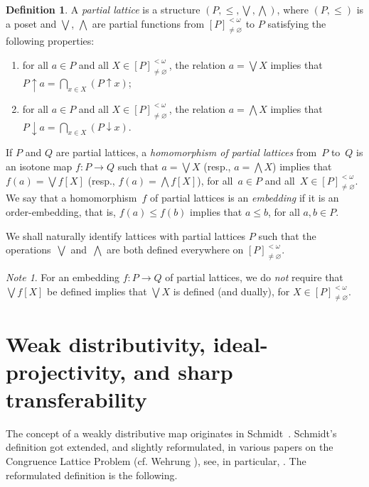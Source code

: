 \documentclass[reqno]{amsart}
\numberwithin{equation}{section}
\theoremstyle{plain}
\theoremstyle{definition}
\newtheorem{definition}[theorem]{Definition}
\theoremstyle{remark}
\newtheorem*{note}{Note}
\numberwithin{figure}{section}
\numberwithin{table}{section}
\begin{document}
\begin{definition}\label{D:PartLatt}
A \emph{partial lattice} is a structure $(P,\leq,\bigvee,\bigwedge)$, where
$(P,\leq)$ is a poset and $\bigvee$, $\bigwedge$ are partial functions from
${[P]_{\neq{\varnothing}}^{<\omega}}$ to $P$ satisfying the following properties:
\begin{enumerate}
\item for all $a\in P$ and all $X\in{[P]_{\neq{\varnothing}}^{<\omega}}$\,, the relation $a=\bigvee X$ implies that $P{\mathbin{\uparrow}} a=\bigcap_{x\in X}(P{\mathbin{\uparrow}} x)$;

\item for all $a\in P$ and all $X\in{[P]_{\neq{\varnothing}}^{<\omega}}$\,, the relation $a=\bigwedge X$ implies that $P{\mathbin{\downarrow}} a=\bigcap_{x\in X}(P{\mathbin{\downarrow}} x)$.\end{enumerate}

If $P$ and $Q$ are partial lattices, a \emph{homomorphism of partial lattices} from~$P$ to~$Q$ is an isotone map
$f\colon P\to Q$ such that $a=\bigvee X$
(resp., $a=\bigwedge X$) implies that $f(a)=\bigvee f[X]$ (resp., $f(a)=\bigwedge f[X]$),
for all~$a\in P$ and all~$X\in{[P]_{\neq{\varnothing}}^{<\omega}}$. We say that a homomorphism~$f$ of partial lattices is an
\emph{embedding} if it is an order-embedding, that is, $f(a)\leq f(b)$ implies that $a\leq b$, for all
$a,b\in P$.
\end{definition}

We shall naturally identify lattices with partial lattices $P$ such that the operations~$\bigvee$ and~$\bigwedge$ are both defined everywhere on ${[P]_{\neq{\varnothing}}^{<\omega}}$.

\begin{note}
For an embedding $f\colon P\to Q$ of partial lattices, we do \emph{not}
require that $\bigvee f[X]$ be defined implies that $\bigvee X$ is defined (and
dually), for $X\in{[P]_{\neq{\varnothing}}^{<\omega}}$.
\end{note}

\section{Weak distributivity, {i\-de\-al-pro\-jec\-tiv\-ity}, and sharp transferability}\label{S:IdProj}

The concept of a weakly distributive map originates in Schmidt~\cite{Schm68}.
Schmidt's definition got extended, and slightly reformulated, in various papers on the Congruence Lattice Problem (cf. Wehrung \cite{STA1-7,STA1-9}), see, in particular, \cite[Definition 7-3.4]{STA1-7}.
The reformulated definition is the following.
\end{document}
